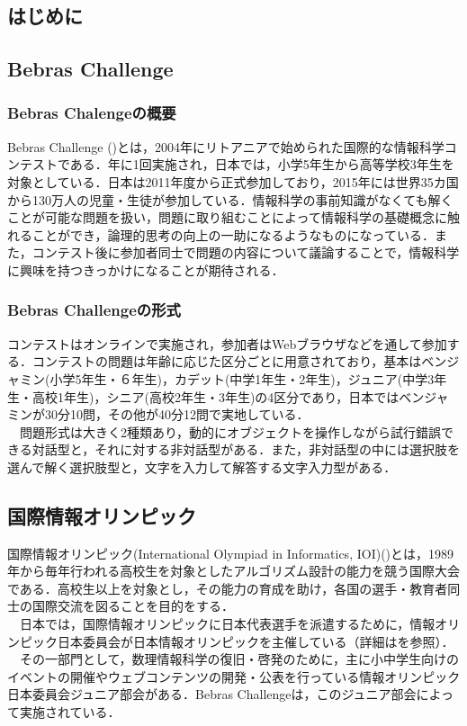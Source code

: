 \documentclass[a4paper]{jarticle}
\begin{document}
\maketitle
\begin{multicols}{2}
\setcounter{page}{1}

\section{はじめに}

\subsection{Bebras Challenge}
\subsubsection{Bebras Chalengeの概要}
Bebras Challenge (\cite{bebras-contest, bebras-pdf})とは，2004年にリトアニアで始められた国際的な情報科学コンテストである．年に1回実施され，日本では，小学5年生から高等学校3年生を対象としている．日本は2011年度から正式参加しており，2015年には世界35カ国から130万人の児童・生徒が参加している．情報科学の事前知識がなくても解くことが可能な問題を扱い，問題に取り組むことによって情報科学の基礎概念に触れることができ，論理的思考の向上の一助になるようなものになっている．また，コンテスト後に参加者同士で問題の内容について議論することで，情報科学に興味を持つきっかけになることが期待される．

\subsubsection{Bebras Challengeの形式}
 コンテストはオンラインで実施され，参加者はWebブラウザなどを通して参加する．コンテストの問題は年齢に応じた区分ごとに用意されており，基本はベンジャミン(小学5年生・６年生)，カデット(中学1年生・2年生)，ジュニア(中学3年生・高校1年生)，シニア(高校2年生・3年生)の4区分であり，日本ではベンジャミンが30分10問，その他が40分12問で実地している．
\\　問題形式は大きく2種類あり，動的にオブジェクトを操作しながら試行錯誤できる対話型と，それに対する非対話型がある．また，非対話型の中には選択肢を選んで解く選択肢型と，文字を入力して解答する文字入力型がある．

\subsection{国際情報オリンピック}
国際情報オリンピック(International Olympiad in Informatics, IOI)(\cite{ioi})とは，1989年から毎年行われる高校生を対象としたアルゴリズム設計の能力を競う国際大会である．高校生以上を対象とし，その能力の育成を助け，各国の選手・教育者同士の国際交流を図ることを目的をする．
\\　日本では，国際情報オリンピックに日本代表選手を派遣するために，情報オリンピック日本委員会が日本情報オリンピックを主催している（詳細は\cite{joi}を参照）．
\\　その一部門として，数理情報科学の復旧・啓発のために，主に小中学生向けのイベントの開催やウェブコンテンツの開発・公表を行っている情報オリンピック日本委員会ジュニア部会がある．Bebras Challengeは，このジュニア部会によって実施されている．



\end{multicols}
\end{document}
